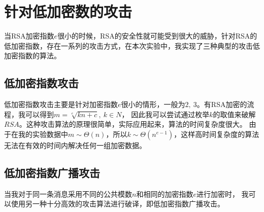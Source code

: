 \documentclass{ctexart}
\begin{document}
\section{针对低加密数的攻击}
当RSA加密指数$e$很小的时候，RSA的安全性就可能受到很大的威胁，针对RSA的低加密指数，存在一系列的攻击方式，在本次实验中，我实现了三种典型的攻击低加密指数的算法。
\subsection{低加密指数攻击}
低加密指数攻击主要是针对加密指数$e$很小的情形，一般为$2,\ 3$。有RSA加密的流程，我可以得到$m=\sqrt[e]{kn+c},\ k\in N$，
因此我可以尝试通过枚举$k$的取值来破解$RSA$。这种攻击算法的原理很简单，实际应用起来，算法的时间复杂度很大。
由于在我的实验数据中$m\sim \Theta(n)$，所以$k\sim \Theta(n^{e-1})$，这样高时间复杂度的算法无法在有效的时间内解决任何一组加密数据。
\subsection{低加密指数广播攻击}
当我对于同一条消息采用不同的公共模数$n$和相同的加密指数$e$进行加密时，
我可以使用另一种十分高效的攻击算法进行破译，即低加密指数广播攻击。
\end{document}
